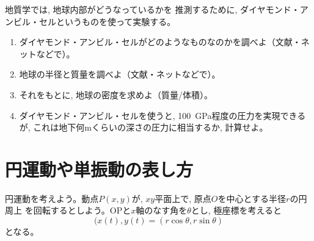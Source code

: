 \begin{faq}
{{\begin{q}\label{q:pressure2} 地質学では, 地球内部がどうなっているかを
推測するために, ダイヤモンド・アンビル・セルというものを使って実験する。
\begin{enumerate}
\item ダイヤモンド・アンビル・セルがどのようなものなのかを調べよ（文献・ネットなどで）。
\item 地球の半径と質量を調べよ（文献・ネットなどで）。
\item それをもとに, 地球の密度を求めよ（質量/体積）。
\item ダイヤモンド・アンビル・セルを使うと, 100~GPa程度の圧力を実現できるが, 
これは地下何mくらいの深さの圧力に相当するか, 計算せよ。
\end{enumerate}
\end{q}









\section{円運動や単振動の表し方}

円運動を考えよう。動点$P(x, y)$が, $xy$平面上で, 原点$O$を中心とする半径$r$の円周上
を回転するとしよう。OPと$x$軸のなす角を$\theta$とし, 極座標を考えると
\[(x(t), y(t)=(r\cos\theta, r\sin\theta)\]
となる。

}}
\end{faq}
